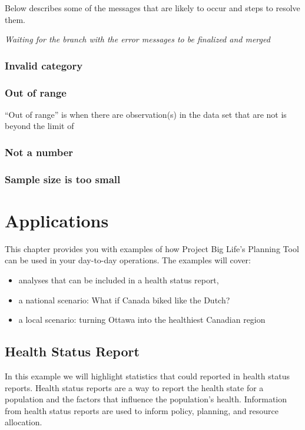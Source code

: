 \documentclass[]{book}
\providecommand{\tightlist}{%
  \setlength{\itemsep}{0pt}\setlength{\parskip}{0pt}}
\begin{document}
Below describes some of the messages that are likely to occur and steps
to resolve them.

\emph{Waiting for the branch with the error messages to be finalized and
merged}

\subsection{Invalid category}\label{invalid-category}

\subsection{Out of range}\label{out-of-range}

``Out of range'' is when there are observation(s) in the data set that
are not is beyond the limit of

\subsection{Not a number}\label{not-a-number}

\subsection{Sample size is too small}\label{sample-size-is-too-small}

\chapter{Applications}\label{applications}

This chapter provides you with examples of how Project Big Life's
Planning Tool can be used in your day-to-day operations. The examples
will cover:

\begin{itemize}
\tightlist
\item
  analyses that can be included in a health status report,
\item
  a national scenario: What if Canada biked like the Dutch?
\item
  a local scenario: turning Ottawa into the healthiest Canadian region
\end{itemize}

\section{Health Status Report}\label{health-status-report}

In this example we will highlight statistics that could reported in
health status reports. Health status reports are a way to report the
health state for a population and the factors that influence the
population's health. Information from health status reports are used to
inform policy, planning, and resource allocation.
\end{document}
